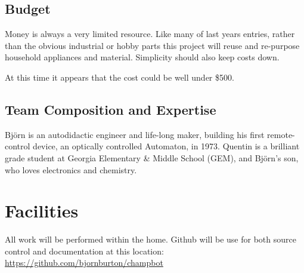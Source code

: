 \documentclass[]{article}
\begin{document}
\subsection{Budget}
Money is always a very limited resource.
Like many of last years entries, rather than the obvious industrial or hobby parts this project will reuse and re-purpose household appliances and material.
Simplicity should also keep costs down.

At this time it appears that the cost could be well under \$500.

   
\subsection{Team Composition and Expertise}
Bj{\"o}rn is an autodidactic engineer and life-long maker, building his first remote-control device, an optically controlled Automaton, in 1973.  
Quentin is a brilliant  grade student at Georgia Elementary \& Middle School (GEM), and Bj{\"o}rn's son, who loves electronics and chemistry.


\section{Facilities}
All work will be performed within the home.
Github will be use for both source control and documentation at this location:
\url{https://github.com/bjornburton/champbot}
\end{document}
